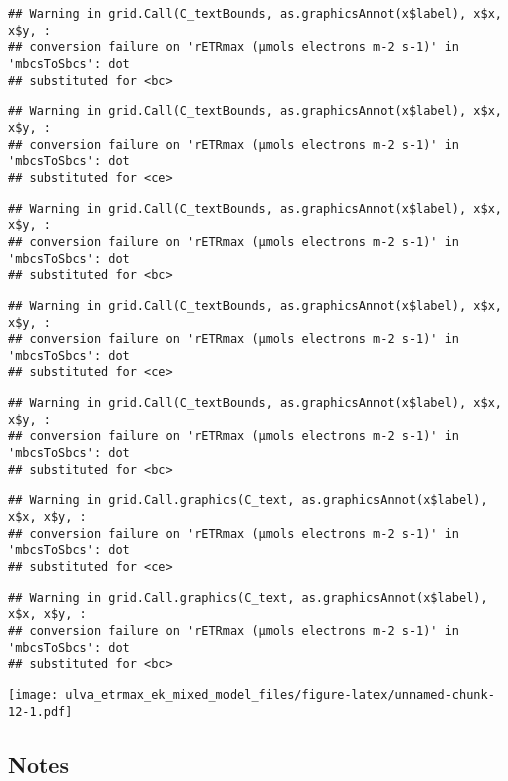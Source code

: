 \documentclass[
]{article}
\begin{document}
\begin{verbatim}
## Warning in grid.Call(C_textBounds, as.graphicsAnnot(x$label), x$x, x$y, :
## conversion failure on 'rETRmax (μmols electrons m-2 s-1)' in 'mbcsToSbcs': dot
## substituted for <bc>
\end{verbatim}

\begin{verbatim}
## Warning in grid.Call(C_textBounds, as.graphicsAnnot(x$label), x$x, x$y, :
## conversion failure on 'rETRmax (μmols electrons m-2 s-1)' in 'mbcsToSbcs': dot
## substituted for <ce>
\end{verbatim}

\begin{verbatim}
## Warning in grid.Call(C_textBounds, as.graphicsAnnot(x$label), x$x, x$y, :
## conversion failure on 'rETRmax (μmols electrons m-2 s-1)' in 'mbcsToSbcs': dot
## substituted for <bc>
\end{verbatim}

\begin{verbatim}
## Warning in grid.Call(C_textBounds, as.graphicsAnnot(x$label), x$x, x$y, :
## conversion failure on 'rETRmax (μmols electrons m-2 s-1)' in 'mbcsToSbcs': dot
## substituted for <ce>
\end{verbatim}

\begin{verbatim}
## Warning in grid.Call(C_textBounds, as.graphicsAnnot(x$label), x$x, x$y, :
## conversion failure on 'rETRmax (μmols electrons m-2 s-1)' in 'mbcsToSbcs': dot
## substituted for <bc>
\end{verbatim}

\begin{verbatim}
## Warning in grid.Call.graphics(C_text, as.graphicsAnnot(x$label), x$x, x$y, :
## conversion failure on 'rETRmax (μmols electrons m-2 s-1)' in 'mbcsToSbcs': dot
## substituted for <ce>
\end{verbatim}

\begin{verbatim}
## Warning in grid.Call.graphics(C_text, as.graphicsAnnot(x$label), x$x, x$y, :
## conversion failure on 'rETRmax (μmols electrons m-2 s-1)' in 'mbcsToSbcs': dot
## substituted for <bc>
\end{verbatim}

\texttt{[image: ulva\_etrmax\_ek\_mixed\_model\_files/figure-latex/unnamed-chunk-12-1.pdf]}

\hypertarget{notes}{%
\subsection{Notes}\label{notes}}
\end{document}
